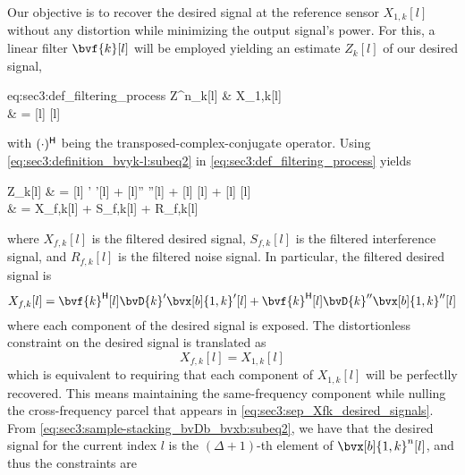 Our objective is to recover the desired signal at the reference sensor $X_{1,k}[l]$ without any distortion while minimizing the output signal's power. For this, a linear filter $\bvf{k}[l]$ will be employed yielding an estimate $Z_{k}[l]$ of our desired signal,
\begin{equations}{eq:sec3:def_filtering_process}
	Z^n_{k}[l]
	& \approx X_{1,k}[l] \\
	& =  
\end{equations}
with $\he{(\cdot)}$ being the transposed-complex-conjugate operator. %
Using \cref{eq:sec3:definition_bvyk-l:subeq2} in \cref{eq:sec3:def_filtering_process} yields
\begin{equations}
	Z_{k}[l] 
	& =  ' '[l] + '' ''[l] +   +   \\
	& = X_{f,k}[l] + S_{f,k}[l] + R_{f,k}[l]
\end{equations}
where $X_{f,k}[l]$ is the filtered desired signal, $S_{f,k}[l]$ is the filtered interference signal, and $R_{f,k}[l]$ is the filtered noise signal. In particular, the filtered desired signal is
\begin{equation}
	\label{eq:sec3:sep_Xfk_desired_signals}
	X_{f,k}[l] = \he{\bvf{k}}[l] \bvD{k}' \bvx[b]{1,k}'[l] + \he{\bvf{k}}[l]\bvD{k}'' \bvx[b]{1,k}''[l]
\end{equation}
where each component of the desired signal is exposed. The distortionless constraint on the desired signal is translated as
\begin{equation}
	\label{eq:sec3:hard_distortionless_constriant}
	X_{f,k}[l] = X_{1,k}[l]
\end{equation}
which is equivalent to requiring that each component of $X_{1,k}[l]$ will be perfectlly recovered. This means maintaining the same-frequency component while nulling the cross-frequency parcel that appears in \cref{eq:sec3:sep_Xfk_desired_signals}. From \cref{eq:sec3:sample-stacking_bvDb_bvxb:subeq2}, we have that the desired signal for the current index $l$ is the $(\Delta+1)$-th element of $\bvx[b]{1,k}^n[l]$, and thus the constraints are
